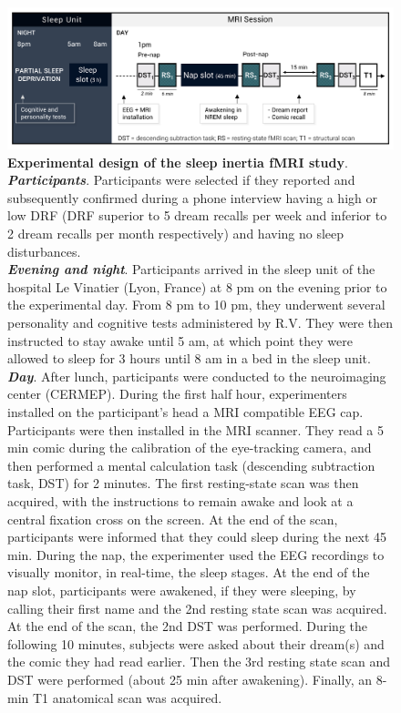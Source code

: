 \begin{figure}[!htbp]
	\includegraphics[width=\textwidth]{Fig/Intro/Intro_paradigm_fMRI/Intro_paradigm_fMRI.png}
	\caption[Experimental design of the fMRI study]{\textbf{Experimental design of the sleep inertia fMRI study}. \\
    \emph{\textbf{Participants}}. Participants were selected if they reported and subsequently confirmed during a phone interview having a high or low DRF (DRF superior to 5 dream recalls per week and inferior to 2 dream recalls per month respectively) and having no sleep disturbances. \\
    \emph{\textbf{Evening and night}}. Participants arrived in the sleep unit of the hospital Le Vinatier (Lyon, France) at 8 pm on the evening prior to the experimental day. From 8 pm to 10 pm, they underwent several personality and cognitive tests administered by R.V. They were then instructed to stay awake until 5 am, at which point they were allowed to sleep for 3 hours until 8 am in a bed in the sleep unit. \\
    \emph{\textbf{Day}}. After lunch, participants were conducted to the neuroimaging center (CERMEP). During the first half hour, experimenters installed on the participant’s head a MRI compatible EEG cap. Participants were then installed in the MRI scanner. They read a 5 min comic during the calibration of the eye-tracking camera, and then performed a mental calculation task (descending subtraction task, DST) for 2 minutes. The first resting-state scan was then acquired, with the instructions to remain awake and look at a central fixation cross on the screen. At the end of the scan, participants were informed that they could sleep during the next 45 min. During the nap, the experimenter used the EEG recordings to visually monitor, in real-time, the sleep stages. At the end of the nap slot, participants were awakened, if they were sleeping, by calling their first name and the 2nd resting state scan was acquired. At the end of the scan, the 2nd DST was performed. During the following 10 minutes, subjects were asked about their dream(s) and the comic they had read earlier. Then the 3rd resting state scan and DST were performed (about 25 min after awakening). Finally, an 8-min T1 anatomical scan was acquired.}
	\label{fig:intro:problematics-fmri-paradigm}
\end{figure}

